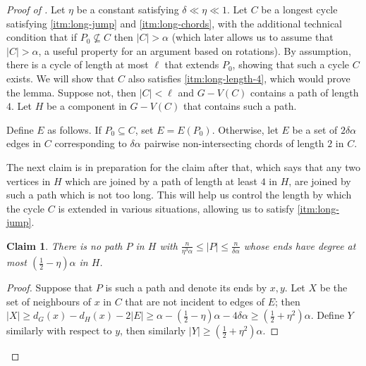 \documentclass[11pt,english]{article}
\theoremstyle{plain}
\newtheorem{claim}[theorem]{Claim}
\theoremstyle{definition}
\theoremstyle{remark}
\begin{document}
		\begin{proof}[Proof of ]
			Let $\eta$ be a constant satisfying $\delta \ll \eta \ll 1$.
			Let $C$ be a longest cycle satisfying \ref{itm:long-jump} and \ref{itm:long-chords}, with the additional technical condition that if $P_0 \not\subseteq C$ then $|C| > \alpha$ (which later allows us to assume that $|C| > \alpha$, a useful property for an argument based on rotations). By assumption, there is a cycle of length at most $\ell$ that extends $P_0$, showing that such a cycle $C$ exists. We will show that $C$ also satisfies \ref{itm:long-length-4}, which would prove the lemma. Suppose not, then $|C| < \ell$ and $G - V(C)$ contains a path of length $4$. Let $H$ be a component in $G - V(C)$ that contains such a path.

			Define $E$ as follows. If $P_0 \subseteq C$, set $E = E(P_0)$. Otherwise, let $E$ be a set of $2\delta \alpha$ edges in $C$ corresponding to $\delta \alpha$ pairwise non-intersecting chords of length $2$ in $C$.

			The next claim is in preparation for the claim after that, which says that any two vertices in $H$ which are joined by a path of length at least $4$ in $H$, are joined by such a path which is not too long. This will help us control the length by which the cycle $C$ is extended in various situations, allowing us to satisfy \ref{itm:long-jump}.

			\begin{claim} \label{claim:med-path}
				There is no path $P$ in $H$ with $\frac{n}{\eta^3\alpha} \le |P| \le \frac{n}{\delta\alpha}$ whose ends have degree at most $(\frac{1}{2} - \eta) \alpha$ in $H$.
			\end{claim}

			\begin{proof}
				Suppose that $P$ is such a path and denote its ends by $x, y$.
				Let $X$ be the set of neighbours of $x$ in $C$ that are not incident to edges of $E$; then $|X| \ge d_G(x) - d_H(x) - 2|E| \ge \alpha - (\frac{1}{2} - \eta)\alpha - 4\delta \alpha \ge (\frac{1}{2} + \eta^2)\alpha$. Define $Y$ similarly with respect to $y$, then similarly $|Y| \ge (\frac{1}{2} + \eta^2)\alpha$.


\end{proof}
\end{proof}
\end{document}
